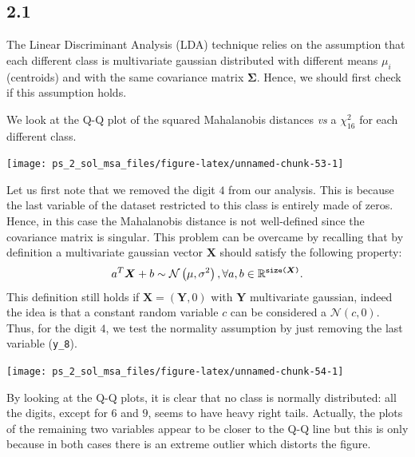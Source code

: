 \documentclass[
]{article}
\theoremstyle{plain}
\begin{document}
\hypertarget{section-5}{%
\subsection{2.1}\label{section-5}}

The Linear Discriminant Analysis (LDA) technique relies on the
assumption that each different class is multivariate gaussian
distributed with different means \(\mu_i\) (centroids) and with the same
covariance matrix \(\boldsymbol{\Sigma}\). Hence, we should first check
if this assumption holds.

We look at the Q-Q plot of the squared Mahalanobis distances \textit{vs}
a \(\chi_{16}^2\) for each different class.

\smallskip

\begin{center}\texttt{[image: ps\_2\_sol\_msa\_files/figure-latex/unnamed-chunk-53-1]} \end{center}

Let us first note that we removed the digit \(4\) from our analysis.
This is because the last variable of the dataset restricted to this
class is entirely made of zeros. Hence, in this case the Mahalanobis
distance is not well-defined since the covariance matrix is singular.
This problem can be overcame by recalling that by definition a
multivariate gaussian vector \(\boldsymbol{X}\) should satisfy the
following property: \[
    a^T \boldsymbol{X} + b \sim \mathcal{N}\left(\mu,\sigma^2\right), \forall a, b \in \mathbb{R}^{\text{\texttt{size(}}\boldsymbol{X}\text{\texttt{)}}}.
\] This definition still holds if
\(\boldsymbol{X} = (\boldsymbol{Y}, 0)\) with \(\boldsymbol{Y}\)
multivariate gaussian, indeed the idea is that a constant random
variable \(c\) can be considered a \(\mathcal{N}\left(c,0\right)\).
Thus, for the digit \(4\), we test the normality assumption by just
removing the last variable (\texttt{y\_8}).

\smallskip

\begin{center}\texttt{[image: ps\_2\_sol\_msa\_files/figure-latex/unnamed-chunk-54-1]} \end{center}

By looking at the Q-Q plots, it is clear that no class is normally
distributed: all the digits, except for \(6\) and \(9\), seems to have
heavy right tails. Actually, the plots of the remaining two variables
appear to be closer to the Q-Q line but this is only because in both
cases there is an extreme outlier which distorts the figure.
\end{document}
